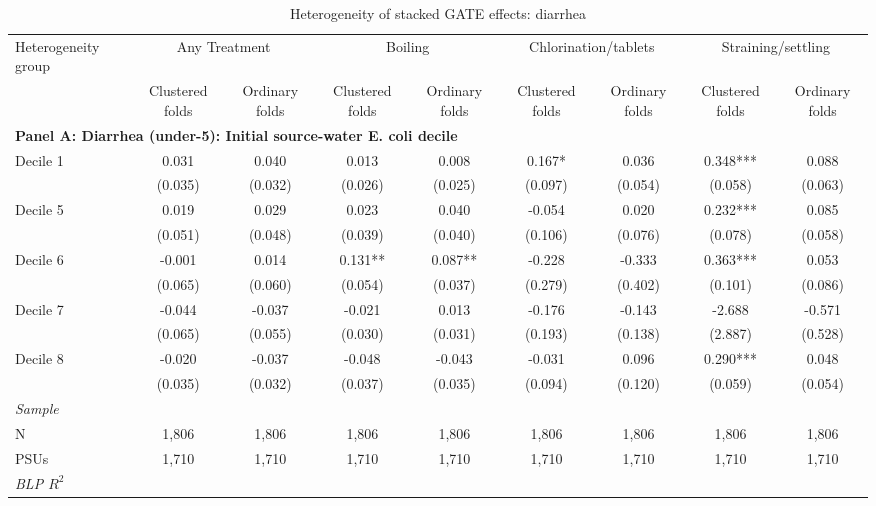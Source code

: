 \begin{landscape}
\begin{table}[p]
\centering
\caption{Heterogeneity of stacked GATE effects: diarrhea}
\label{tab:table_gate_appendix-diarrhea}
\scriptsize\setlength{\tabcolsep}{4pt}
\begin{adjustbox}{max width=\linewidth, center}
\begin{tabular}{lcccccccc}
\toprule
Heterogeneity group & \multicolumn{2}{c}{Any Treatment} & \multicolumn{2}{c}{Boiling} & \multicolumn{2}{c}{Chlorination/tablets} & \multicolumn{2}{c}{Straining/settling} \\
 & Clustered folds & Ordinary folds & Clustered folds & Ordinary folds & Clustered folds & Ordinary folds & Clustered folds & Ordinary folds \\
\midrule
\multicolumn{9}{l}{\textbf{Panel A: Diarrhea (under-5): Initial source-water E. coli decile}} \\
Decile 1 & 0.031 & 0.040 & 0.013 & 0.008 & 0.167* & 0.036 & 0.348*** & 0.088 \\
 & (0.035) & (0.032) & (0.026) & (0.025) & (0.097) & (0.054) & (0.058) & (0.063) \\
Decile 5 & 0.019 & 0.029 & 0.023 & 0.040 & -0.054 & 0.020 & 0.232*** & 0.085 \\
 & (0.051) & (0.048) & (0.039) & (0.040) & (0.106) & (0.076) & (0.078) & (0.058) \\
Decile 6 & -0.001 & 0.014 & 0.131** & 0.087** & -0.228 & -0.333 & 0.363*** & 0.053 \\
 & (0.065) & (0.060) & (0.054) & (0.037) & (0.279) & (0.402) & (0.101) & (0.086) \\
Decile 7 & -0.044 & -0.037 & -0.021 & 0.013 & -0.176 & -0.143 & -2.688 & -0.571 \\
 & (0.065) & (0.055) & (0.030) & (0.031) & (0.193) & (0.138) & (2.887) & (0.528) \\
Decile 8 & -0.020 & -0.037 & -0.048 & -0.043 & -0.031 & 0.096 & 0.290*** & 0.048 \\
 & (0.035) & (0.032) & (0.037) & (0.035) & (0.094) & (0.120) & (0.059) & (0.054) \\
\multicolumn{9}{l}{\textit{Sample}} \\
\quad N & 1,806 & 1,806 & 1,806 & 1,806 & 1,806 & 1,806 & 1,806 & 1,806 \\
\quad PSUs & 1,710 & 1,710 & 1,710 & 1,710 & 1,710 & 1,710 & 1,710 & 1,710 \\
\multicolumn{9}{l}{\textit{BLP $R^{2}$}} \\

\end{tabular}
\end{adjustbox}
\end{table}
\end{landscape}
